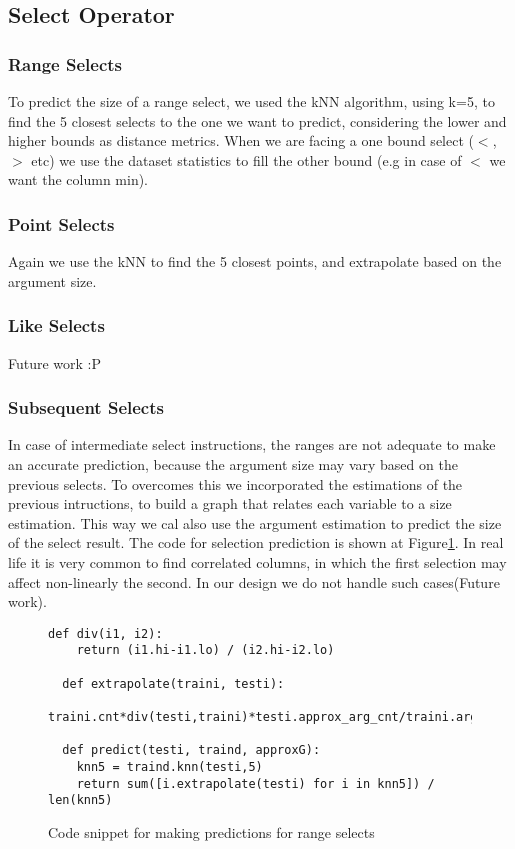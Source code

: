 \subsection{Select Operator}
\subsubsection{Range Selects}
To predict the size of a range select, we used the kNN algorithm,
using k=5, to find the 5 closest selects to the one we want to predict,
considering the lower and higher bounds as distance metrics.
When we are facing a one bound select ($<$,$>$ etc) we use the
dataset statistics to fill the other bound (e.g in case of $<$ we want the column min).
\subsubsection{Point Selects}
Again we use the kNN to find the 5 closest points,
and extrapolate based on the argument size.

\subsubsection{Like Selects}
Future work :P

\subsubsection{Subsequent Selects}
In case of intermediate select instructions, the ranges are not adequate to
make an accurate prediction, because the argument size may vary based on the
previous selects. To overcomes this we incorporated the estimations of the
previous intructions, to build a graph that relates each variable to a size
estimation. This way we cal also use the argument estimation to predict the
size of the select result. The code for selection prediction is shown at
Figure\ref{sel:code}. In real life it is very common to find correlated columns,
in which the first selection may affect non-linearly the second.
In our design we do not handle such cases(Future work).

\begin{figure}[t]
\begin{lstlisting}[frame=single]
  def div(i1, i2):
    return (i1.hi-i1.lo) / (i2.hi-i2.lo)

  def extrapolate(traini, testi):
      traini.cnt*div(testi,traini)*testi.approx_arg_cnt/traini.argcnt

  def predict(testi, traind, approxG):
    knn5 = traind.knn(testi,5)
    return sum([i.extrapolate(testi) for i in knn5]) / len(knn5)
\end{lstlisting}
  \caption{Code snippet for making predictions for range selects}
  \label{sel:code}
\end{figure}


